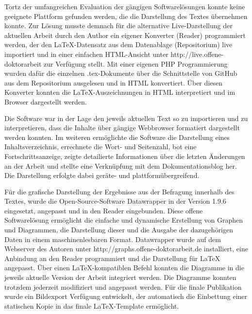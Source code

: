 Tortz der umfangreichen Evaluation der gängigen Softwarelösungen konnte keine geeignete Plattform gefunden werden, die die Darstellung des Textes übernehmen konnte. Zur Lösung musste demnach für die alternative Live-Darstellung der aktuellen Arbeit durch den Author ein eigener Konverter (Reader) programmiert werden, der den LaTeX-Datensatz aus dem Datenablage (Repositorium) live importiert und in einer einfachen HTML-Ansicht unter http://live.offene-doktorarbeit zur Verfügung stellt. Mit einer eigenen PHP Programmierung wurden dafür die einzelnen .tex-Dokumente über die Schnittstelle von GitHub aus dem Repositorium ausgelesen und in HTML konvertiert. Über diesen Konverter konnten die LaTeX-Auszeichnungen in HTML interpretiert und im Browser dargestellt werden.

Die Software war in der Lage den jeweils aktuellen Text so zu importieren und zu interpretieren, dass die Inhalte über gängige Webbrowser formatiert dargestellt werden konnten. Im weiteren ermöglichte die Software die Darstellung eines Inhaltsverzeichnis, errechnete die Wort- und Seitenzahl, bot eine Fortschrittsanzeige, zeigte detailierte Informationen über die letzten Änderungen an der Arbeit und stellte eine Verknüpfung mit dem Dokumentationsblog her. Die Darstellung erfolgte dabei geräte- und plattformübergreifend.

Für die grafische Darstellung der Ergebnisse aus der Befragung innerhalb des Textes, wurde die Open-Source-Software Datawrapper \cite{datawrapper_2015} in der Version 1.9.6 eingesetzt, angepasst und in den Reader eingebunden. Diese offene Softwarelösung ermöglicht die einfache und dynamische Erstellung von Graphen und Diagrammen, die Darstellung dieser und die Ausgabe der dazugehörigen Daten in einem maschinenlesbaren Format. Datawrapper wurde auf dem Webserver des Autoren unter http://graphs.offene-doktorarbeit.de installiert, eine Anbindung an den Reader programmiert und die Darstellung für LaTeX angepasst. Über einen LaTeX-kompatiblen Befehl konnten die Diagramme in die jeweils aktuelle Version der Arbeit integriert werden. Die Diagramme konnten trotzdem jederzeit modifiziert und angepasst werden. Für die finale Publikation wurde ein Bildexport Verfügung entwickelt, der automatisch die Einbettung einer statischen Kopie in das finale LaTeX-Template ermöglicht.

